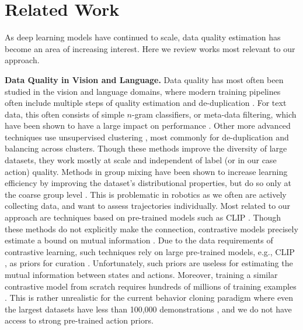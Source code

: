 \section{Related Work}
\label{sec:related_work}
As deep learning models have continued to scale, data quality estimation has become an area of increasing interest. Here we review works most relevant to our approach.

\textbf{Data Quality in Vision and Language.} Data quality has most often been studied in the vision and language domains, where modern training pipelines often include multiple steps of quality estimation and de-duplication \citep{albalak2024survey, together2023redpajama, penedo2024fineweb}. For text data, this often consists of simple $n$-gram classifiers, or meta-data filtering, which have been shown to have a large impact on performance \citep{xu2024demystifying}. Other more advanced techniques use unsupervised clustering  \citep{vo2024automatic, NEURIPS2023_a8f8cbd7, abbas2023semdedup, birodkar2019semantic}, most commonly for de-duplication and balancing across clusters. Though these methods improve the diversity of large datasets, they work mostly at scale and independent of label (or in our case action) quality. Methods in group mixing have been shown to increase learning efficiency by improving the dataset's distributional properties, but do so only at the coarse group level \citep{chen2024aioli, chen2024skill, doremi, fandoge}. This is problematic in robotics as we often are actively collecting data, and want to assess trajectories individually. Most related to our approach are techniques based on pre-trained models such as CLIP \citep{fang2024data}. Though these methods do not explicitly make the connection, contrastive models precisely estimate a bound on mutual information \citep{ma2018noise, oord2018representation}. Due to the data requirements of contrastive learning, such techniques rely on large pre-trained models, e.g., CLIP \citep{radford2021learning}, as priors for curation \citep{fang2024data}. Unfortunately, such priors are useless for estimating the mutual information between states and actions. Moreover, training a similar contrastive model from scratch requires hundreds of millions of training examples \citep{xu2024demystifying}. This is rather unrealistic for the current behavior cloning paradigm where even the largest datasets have less than 100,000 demonstrations \citep{droid}, and we do not have access to strong pre-trained action priors.

